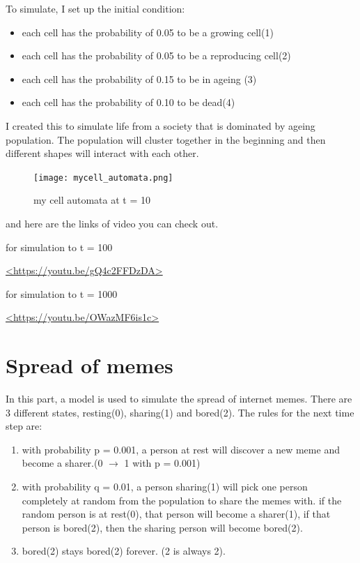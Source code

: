 \documentclass[12pt]{article}
\begin{document}
To simulate, I set up the initial condition:

\begin{itemize}  
\item each cell has the probability of 0.05 to be a growing cell(1)
\item each cell has the probability of 0.05 to be a reproducing cell(2)
\item each cell has the probability of 0.15 to be in ageing (3)
\item each cell has the probability of 0.10 to be dead(4)
\end{itemize}

I created this to simulate life from a society that is dominated by ageing population. The population will cluster together in the beginning and then different shapes will interact with each other.

\begin{figure}[H] %
\centering
\texttt{[image: mycell\_automata.png]}
\caption{my cell automata at t = 10}
\label{fig:myca}
\end{figure}

and here are the links of video you can check out.\par 
for simulation to t = 100\par
\url{<https://youtu.be/gQ4c2FFDzDA>}\par
for simulation to t = 1000\par
\url{<https://youtu.be/OWazMF6is1c>}\par




\newpage
\section{Spread of memes}
\doublespacing
In this part, a model is used to simulate the spread of internet memes. There are 3 different states, resting(0), sharing(1) and bored(2). The rules for the next time step are:

\begin{enumerate}
\item with probability p = 0.001, a person at rest will discover a new meme and become a sharer.(0 $\rightarrow$ 1 with p = 0.001) 
\item with probability q = 0.01, a person sharing(1) will pick one person completely at random from the population to share the memes with. if the random person is at rest(0), that person will become a sharer(1), if that person is bored(2), then the sharing person will become bored(2). 
\item bored(2) stays bored(2) forever. (2 is always 2).
\end{enumerate}
\end{document}
